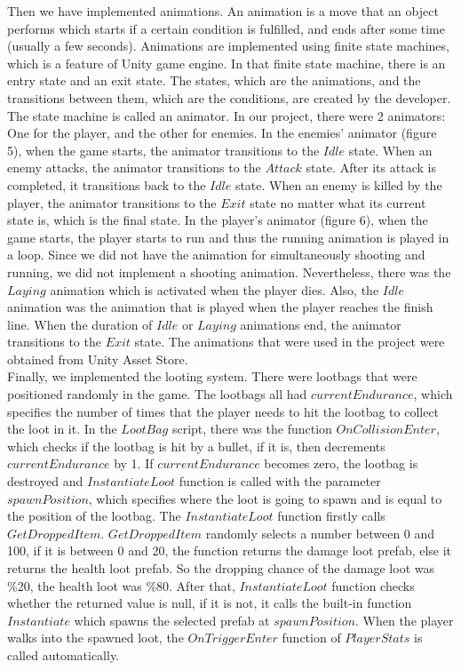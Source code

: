 \documentclass[a4paper]{article}
\begin{document}
\begin{minipage}{\dimexpr\textwidth-1cm}
\hspace{0.5cm}
Then we have implemented animations. An animation is a move that an object performs which starts if a certain condition is fulfilled, and ends after some time (usually a few seconds). Animations are implemented using finite state machines, which is a feature of Unity game engine. In that finite state machine, there is an entry state and an exit state. The states, which are the animations, and the transitions between them, which are the conditions, are created by the developer. The state machine is called an animator. In our project, there were 2 animators: One for the player, and the other for enemies. In the enemies' animator (figure 5), when the game starts, the animator transitions to the $Idle$ state. When an enemy attacks, the animator transitions to the $Attack$ state. After its attack is completed, it transitions back to the $Idle$ state. When an enemy is killed by the player, the animator transitions to the $Exit$ state no matter what its current state is, which is the final state. In the player's animator (figure 6), when the game starts, the player starts to run and thus the running animation is played in a loop. Since we did not have the animation for simultaneously shooting and running, we did not implement a shooting animation. Nevertheless, there was the $Laying$ animation which is activated when the player dies. Also, the $Idle$ animation was the animation that is played when the player reaches the finish line. When the duration of $Idle$ or $Laying$ animations end, the animator transitions to the $Exit$ state. The animations that were used in the project were obtained from Unity Asset Store.\\
Finally, we implemented the looting system. There were lootbags that were positioned randomly in the game. The lootbags all had $currentEndurance$, which specifies the number of times that the player needs to hit the lootbag to collect the loot in it. In the $LootBag$ script, there was the function $OnCollisionEnter$, which checks if the lootbag is hit by a bullet, if it is, then decrements $currentEndurance$ by 1. If $currentEndurance$ becomes zero, the lootbag is destroyed and $InstantiateLoot$ function is called with the parameter $spawnPosition$, which specifies where the loot is going to spawn and is equal to the position of the lootbag. The $InstantiateLoot$ function firstly calls $GetDroppedItem$. $GetDroppedItem$ randomly selects a number between 0 and 100, if it is between 0 and 20, the function returns the damage loot prefab, else it returns the health loot prefab. So the dropping chance of the damage loot was \%20, the health loot was \%80. After that, $InstantiateLoot$ function checks whether the returned value is null, if it is not, it calls the built-in function $Instantiate$ which spawns the selected prefab at $spawnPosition$. When the player walks into the spawned loot, the $OnTriggerEnter$ function of $PlayerStats$ is called automatically.\\
\end{minipage}
\end{document}
